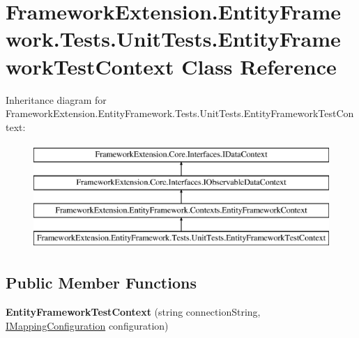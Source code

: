 \hypertarget{class_framework_extension_1_1_entity_framework_1_1_tests_1_1_unit_tests_1_1_entity_framework_test_context}{\section{Framework\-Extension.\-Entity\-Framework.\-Tests.\-Unit\-Tests.\-Entity\-Framework\-Test\-Context Class Reference}
\label{class_framework_extension_1_1_entity_framework_1_1_tests_1_1_unit_tests_1_1_entity_framework_test_context}
}
Inheritance diagram for Framework\-Extension.\-Entity\-Framework.\-Tests.\-Unit\-Tests.\-Entity\-Framework\-Test\-Context\-:\begin{figure}[H]
\begin{center}
\leavevmode
\includegraphics[height=4.000000cm]{class_framework_extension_1_1_entity_framework_1_1_tests_1_1_unit_tests_1_1_entity_framework_test_context}
\end{center}
\end{figure}
\subsection*{Public Member Functions}
\begin{DoxyCompactItemize}
\item 
\hypertarget{class_framework_extension_1_1_entity_framework_1_1_tests_1_1_unit_tests_1_1_entity_framework_test_context_a4ccb4eb34f58a8e58befcba20d05b525}{{\bfseries Entity\-Framework\-Test\-Context} (string connection\-String, \hyperlink{interface_framework_extension_1_1_entity_framework_1_1_mappings_1_1_i_mapping_configuration}{I\-Mapping\-Configuration} configuration)}\label{class_framework_extension_1_1_entity_framework_1_1_tests_1_1_unit_tests_1_1_entity_framework_test_context_a4ccb4eb34f58a8e58befcba20d05b525}

\end{DoxyCompactItemize}

